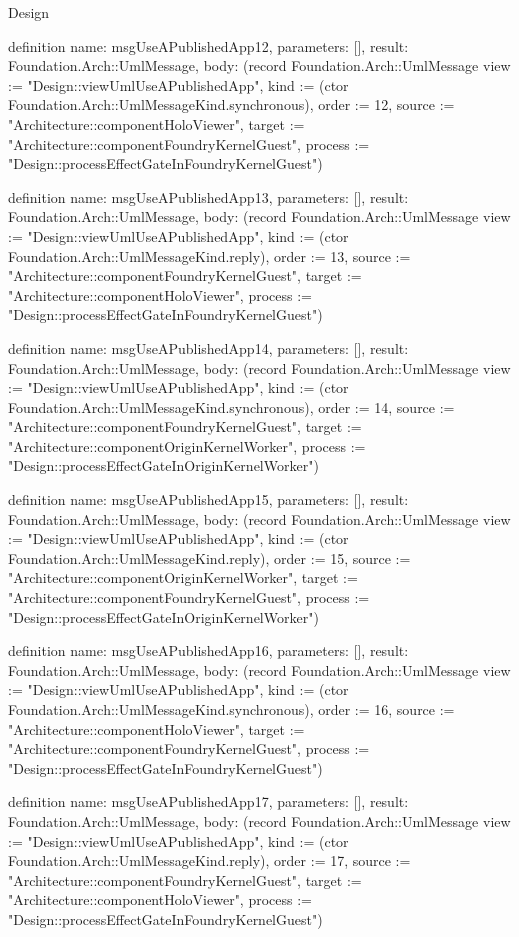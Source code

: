 \begin{lexlean}{Design}
\begin{semanticmodule}
definition{
  name: msgUseAPublishedApp12,
  parameters: [],
  result: Foundation.Arch::UmlMessage,
  body: (record Foundation.Arch::UmlMessage {view := "Design::viewUmlUseAPublishedApp", kind := (ctor Foundation.Arch::UmlMessageKind.synchronous), order := 12, source := "Architecture::componentHoloViewer", target := "Architecture::componentFoundryKernelGuest", process := "Design::processEffectGateInFoundryKernelGuest"})
}

definition{
  name: msgUseAPublishedApp13,
  parameters: [],
  result: Foundation.Arch::UmlMessage,
  body: (record Foundation.Arch::UmlMessage {view := "Design::viewUmlUseAPublishedApp", kind := (ctor Foundation.Arch::UmlMessageKind.reply), order := 13, source := "Architecture::componentFoundryKernelGuest", target := "Architecture::componentHoloViewer", process := "Design::processEffectGateInFoundryKernelGuest"})
}

definition{
  name: msgUseAPublishedApp14,
  parameters: [],
  result: Foundation.Arch::UmlMessage,
  body: (record Foundation.Arch::UmlMessage {view := "Design::viewUmlUseAPublishedApp", kind := (ctor Foundation.Arch::UmlMessageKind.synchronous), order := 14, source := "Architecture::componentFoundryKernelGuest", target := "Architecture::componentOriginKernelWorker", process := "Design::processEffectGateInOriginKernelWorker"})
}

definition{
  name: msgUseAPublishedApp15,
  parameters: [],
  result: Foundation.Arch::UmlMessage,
  body: (record Foundation.Arch::UmlMessage {view := "Design::viewUmlUseAPublishedApp", kind := (ctor Foundation.Arch::UmlMessageKind.reply), order := 15, source := "Architecture::componentOriginKernelWorker", target := "Architecture::componentFoundryKernelGuest", process := "Design::processEffectGateInOriginKernelWorker"})
}

definition{
  name: msgUseAPublishedApp16,
  parameters: [],
  result: Foundation.Arch::UmlMessage,
  body: (record Foundation.Arch::UmlMessage {view := "Design::viewUmlUseAPublishedApp", kind := (ctor Foundation.Arch::UmlMessageKind.synchronous), order := 16, source := "Architecture::componentHoloViewer", target := "Architecture::componentFoundryKernelGuest", process := "Design::processEffectGateInFoundryKernelGuest"})
}

definition{
  name: msgUseAPublishedApp17,
  parameters: [],
  result: Foundation.Arch::UmlMessage,
  body: (record Foundation.Arch::UmlMessage {view := "Design::viewUmlUseAPublishedApp", kind := (ctor Foundation.Arch::UmlMessageKind.reply), order := 17, source := "Architecture::componentFoundryKernelGuest", target := "Architecture::componentHoloViewer", process := "Design::processEffectGateInFoundryKernelGuest"})
}


\end{semanticmodule}
\end{lexlean}
